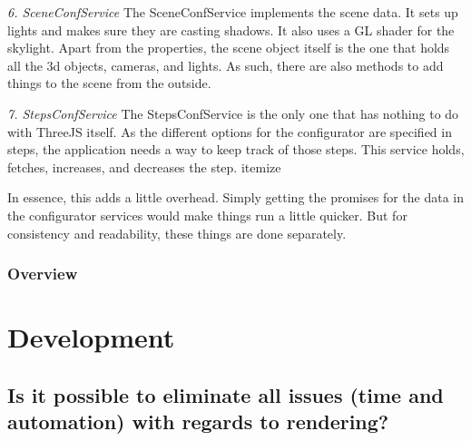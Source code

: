 \textit{6. SceneConfService} \newline
The SceneConfService implements the scene data. It sets up lights and makes sure they are casting shadows. It also uses a GL shader for the skylight. Apart from the properties, the scene object itself is the one that holds all the 3d objects, cameras, and lights. As such, there are also methods to add things to the scene from the outside.\newline

\textit{7. StepsConfService} \newline
The StepsConfService is the only one that has nothing to do with ThreeJS itself. As the different options for the configurator are specified in steps, the application needs a way to keep track of those steps. This service holds, fetches, increases, and decreases the step. itemize

In essence, this adds a little overhead. Simply getting the promises for the data in the configurator services would make things run a little quicker. But for consistency and readability, these things are done separately.

\subsubsection{Overview}


\section{Development}

\subsection{Is it possible to eliminate all issues (time and automation) with regards to rendering?}

